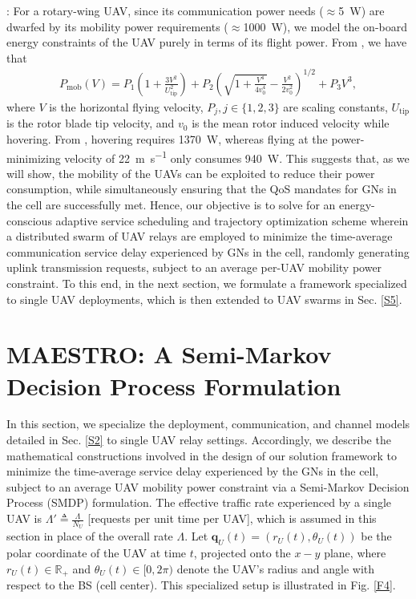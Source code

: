 \documentclass[12pt, draftcls, onecolumn]{IEEEtran}
\theoremstyle{plain}
\theoremstyle{definition}
\theoremstyle{remark}
\begin{document}
: For a rotary-wing UAV, since its communication power needs ($\approx$\qty[mode=text]{5}{\watt}) are dwarfed by its mobility power requirements ($\approx$\qty[mode=text]{1000}{\watt}), we model the on-board energy constraints of the UAV purely in terms of its flight power. From \cite{SCA}, we have that
\begin{align}\label{eq:Power}
    P_{\mathrm{mob}}(V)=P_{1}\left(1+\frac{3V^{2}}{U_{\mathrm{tip}}^{2}}\right)+P_{2}\left(\sqrt{1+\frac{V^{4}}{4v_{0}^{4}}}-\frac{V^{2}}{2v_{0}^{2}}\right)^{1/2}+P_{3}V^{3},
\end{align}
where $V$ is the horizontal flying velocity, $P_{j},j{\in}\{1,2,3\}$ are scaling constants, $U_{\mathrm{tip}}$ is the rotor blade tip velocity, and $v_{0}$ is the mean rotor induced velocity while hovering. From \cite{SCA}, hovering requires \qty[mode=text]{1370}{\watt}, whereas flying at the power-minimizing velocity of \qty[mode=text]{22}{\meter\per\second} only consumes \qty[mode=text]{940}{\watt}. This suggests that, as we will show, the mobility of the UAVs can be exploited to reduce their power consumption, while simultaneously ensuring that the QoS mandates for GNs in the cell are successfully met. Hence, our objective is to solve for an energy-conscious adaptive service scheduling and trajectory optimization scheme wherein a distributed swarm of UAV relays are employed to minimize the time-average communication service delay experienced by GNs in the cell, randomly generating uplink transmission requests, subject to an average per-UAV mobility power constraint. To this end, in the next section, we formulate a framework specialized to single UAV deployments, which is then extended to UAV swarms in Sec. \ref{S5}.
\vspace{-4mm}


\section{MAESTRO: A Semi-Markov Decision Process Formulation}\label{S3}
\vspace{-2mm}

In this section, we specialize the deployment, communication, and channel models detailed in Sec. \ref{S2} to single UAV relay settings. Accordingly, we describe the mathematical constructions involved in the design of our solution framework to minimize the time-average service delay experienced by the GNs in the cell, subject to an average UAV mobility power constraint via a Semi-Markov Decision Process (SMDP) formulation. The effective traffic rate experienced by a single UAV is $\Lambda'{\triangleq}\frac{\Lambda}{N_U}$ [requests per unit time per UAV], which is assumed in this section in place of the overall rate $\Lambda$. Let $\mathbf{q}_{U}(t){=}(r_{U}(t),\theta_{U}(t))$ be the polar coordinate of the UAV at time $t$, projected onto the $x{-}y$ plane, where $r_{U}(t){\in}\mathbb{R}_{+}$ and $\theta_{U}(t){\in}[0,2\pi)$ denote the UAV's radius and angle with respect to the BS (cell center). This specialized setup is illustrated in Fig. \ref{F4}.
\end{document}
